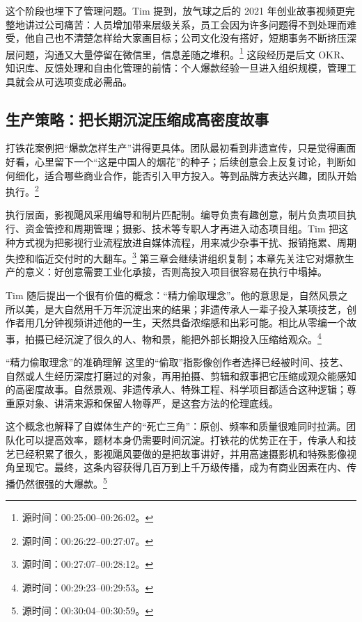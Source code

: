 \documentclass[a4paper]{article}
\begin{document}
这个阶段也埋下了管理问题。Tim 提到，放气球之后的 2021 年创业故事视频更完整地讲过公司痛苦：人员增加带来层级关系，员工会因为许多问题得不到处理而难受，他自己也不清楚怎样给大家画目标；公司文化没有搭好，短期事务不断挤压深层问题，沟通又大量停留在微信里，信息差随之堆积。\footnote{源时间：00:25:00--00:26:02。} 这段经历是后文 OKR、知识库、反馈处理和自由化管理的前情：个人爆款经验一旦进入组织规模，管理工具就会从可选项变成必需品。

\subsection{生产策略：把长期沉淀压缩成高密度故事}

打铁花案例把“爆款怎样生产”讲得更具体。团队最初看到非遗宣传，只是觉得画面好看，心里留下一个“这是中国人的烟花”的种子；后续创意会上反复讨论，判断如何细化，适合哪些商业合作，能否引入甲方投入。等到品牌方表达兴趣，团队开始执行。\footnote{源时间：00:26:22--00:27:07。}

执行层面，影视飓风采用编导和制片匹配制。编导负责有趣创意，制片负责项目执行、资金管控和周期管理；摄影、技术等专职人才再进入动态项目组。Tim 把这种方式视为把影视行业流程放进自媒体流程，用来减少杂事干扰、报销拖累、周期失控和临近交付时的大翻车。\footnote{源时间：00:27:07--00:28:12。} 第三章会继续讲组织复制；本章先关注它对爆款生产的意义：好创意需要工业化承接，否则高投入项目很容易在执行中塌掉。

Tim 随后提出一个很有价值的概念：“精力偷取理念”。他的意思是，自然风景之所以美，是大自然用千万年沉淀出来的结果；非遗传承人一辈子投入某项技艺，创作者用几分钟视频讲述他的一生，天然具备浓缩感和出彩可能。相比从零编一个故事，拍摄已经沉淀了很久的人、物和景，能把外部长期投入压缩给观众。\footnote{源时间：00:29:23--00:29:53。}

\begin{importantbox}{“精力偷取理念”的准确理解}
这里的“偷取”指影像创作者选择已经被时间、技艺、自然或人生经历深度打磨过的对象，再用拍摄、剪辑和叙事把它压缩成观众能感知的高密度故事。自然景观、非遗传承人、特殊工程、科学项目都适合这种逻辑；尊重原对象、讲清来源和保留人物尊严，是这套方法的伦理底线。
\end{importantbox}

这个概念也解释了自媒体生产的“死亡三角”：原创、频率和质量很难同时拉满。团队化可以提高效率，题材本身仍需要时间沉淀。打铁花的优势正在于，传承人和技艺已经积累了很久，影视飓风要做的是把故事讲好，并用高速摄影机和特殊影像视角呈现它。最终，这条内容获得几百万到上千万级传播，成为有商业因素在内、传播仍然很强的大爆款。\footnote{源时间：00:30:04--00:30:59。}
\end{document}
